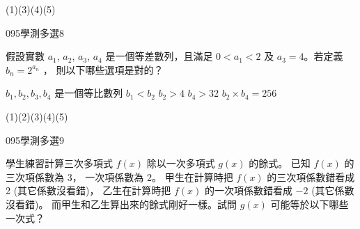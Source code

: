 \begin{QUESTIONS}
\begin{QUESTION}
\begin{QFROMS}
        \end{QFROMS}
        \begin{QTAGS}\end{QTAGS}
        \begin{QANS}
            (1)(3)(4)(5)
        \end{QANS}
        \begin{QSOLLIST}
        \end{QSOLLIST}
        \begin{QEMPTYSPACE}
        \end{QEMPTYSPACE}
    \end{QUESTION}
    \begin{QUESTION}
        \begin{ExamInfo}{095}{學測}{多選}{8}
        \end{ExamInfo}
        \begin{ExamAnsRateInfo}{38}{71}{33}{10}
        \end{ExamAnsRateInfo}
        \begin{QBODY}
			假設實數 $a_1$, $a_2$, $a_3$, $a_4$ 是一個等差數列，且滿足 $0<a_1 <2$ 及 $a_3 =4$。若定義 $b_n =2^{a_n}$ ， 則以下哪些選項是對的？
		\begin{QOPS} 
			\QOP $b_1 ,b_2 ,b_3 ,b_4$ 是一個等比數列 
			\QOP $b_1 <b_{2}$     
			\QOP $b_2 >4$ 
			\QOP $b_4 > 32$
			\QOP $b_2 \times b_4 =256$
		\end{QOPS}
        \end{QBODY}
        \begin{QFROMS}
        \end{QFROMS}
        \begin{QTAGS}\end{QTAGS}
        \begin{QANS}
            (1)(2)(3)(4)(5)
        \end{QANS}
        \begin{QSOLLIST}
        \end{QSOLLIST}
        \begin{QEMPTYSPACE}
        \end{QEMPTYSPACE}
    \end{QUESTION}
    \begin{QUESTION}
        \begin{ExamInfo}{095}{學測}{多選}{9}
        \end{ExamInfo}
        \begin{ExamAnsRateInfo}{38}{71}{30}{13}
        \end{ExamAnsRateInfo}
        \begin{QBODY}
			學生練習計算三次多項式 $f (x)$ 除以一次多項式 $g(x)$ 的餘式。
			已知 $f (x)$ 的三次項係數為 3， 一次項係數為 2。
			甲生在計算時把 $f(x)$ 的三次項係數錯看成 2 (其它係數沒看錯)，
			乙生在計算時把 $f (x)$ 的一次項係數錯看成 $-2$ (其它係數沒看錯)。
			而甲生和乙生算出來的餘式剛好一樣。試問 $g(x)$ 可能等於以下哪些一次式？


\end{QBODY}
\end{QUESTION}
\end{QUESTIONS}

